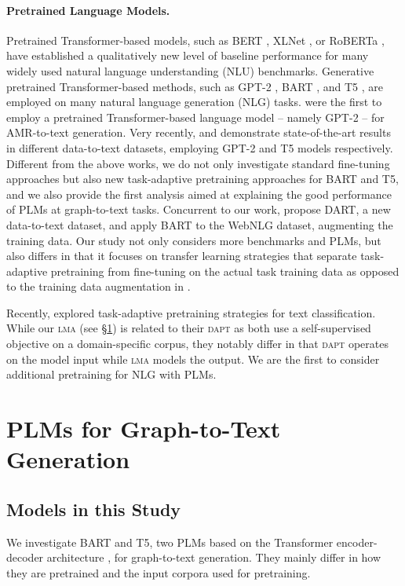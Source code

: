 \documentclass[11pt,a4paper]{article}
\begin{document}
\paragraph{Pretrained Language Models.}  Pretrained Transformer-based models, such as BERT \cite{devlin-etal-2019-bert}, XLNet \cite{NIPS2019_8812}, or RoBERTa \cite{liu2020roberta}, have established a qualitatively new level of baseline performance for many widely used natural language understanding (NLU) benchmarks. Generative pretrained Transformer-based methods, such as GPT-2 \cite{radford2019language}, BART \cite{lewis2019bart}, and T5 \cite{2019t5}, are employed on many natural language generation (NLG) tasks.  \citet{mager2020gpttoo} were the first to employ a pretrained Transformer-based language model -- namely GPT-2 -- for AMR-to-text generation. Very recently, \citet{harkous2020text} and \citet{kale2020texttotext} demonstrate state-of-the-art results in different data-to-text datasets, employing GPT-2 and T5 models respectively. Different from the above works, we do not only investigate standard fine-tuning approaches but also new task-adaptive pretraining approaches for BART and T5, and we also provide the first analysis aimed at explaining the good performance of PLMs at graph-to-text tasks. Concurrent to our work, \citet{radev2020dart} propose DART, a new data-to-text dataset, and apply BART to the WebNLG dataset, augmenting the training data. Our study not only considers more benchmarks and PLMs, but also differs in that it focuses on transfer learning strategies that separate task-adaptive pretraining from fine-tuning on the actual task training data as opposed to the training data augmentation in \citet{radev2020dart}.


Recently, \citet{gururangan-etal-2020-dont} explored task-adaptive pretraining strategies for text classification.
While our \textsc{lma} (see \S\ref{sec:finetuning}) is related to their \textsc{dapt} as both use a self-supervised objective on a domain-specific corpus,
they notably differ in that \textsc{dapt} operates on the model input while \textsc{lma} models the output.
We are the first to consider additional pretraining for NLG with PLMs.




\section{PLMs for Graph-to-Text Generation}
\label{sec:finetuning}
\subsection{Models in this Study}
We investigate BART and T5, two PLMs based on the Transformer encoder-decoder architecture \cite{NIPS2017_7181}, for graph-to-text generation. They mainly differ in how they are pretrained and the input corpora used for pretraining.
\end{document}
